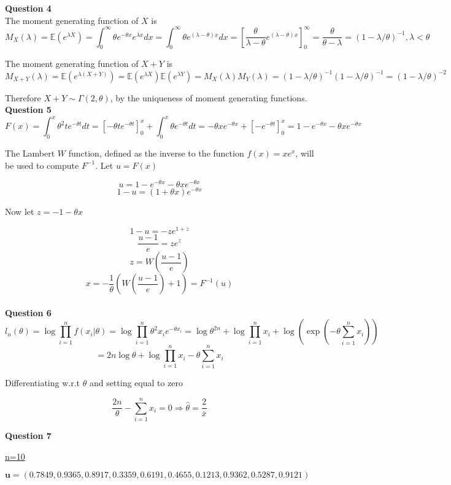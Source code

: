 \documentclass[12pt]{extarticle}
\begin{document}
\textbf{Question 4}\\

The moment generating function of $X$ is 
$$M_X(\lambda) = \mathbb{E}(e^{\lambda X}) = \int_{0}^{\infty} \theta e^{-\theta x}e^{\lambda x}dx = \int_{0}^{\infty} \theta e^{(\lambda-\theta) x}dx =\left[ \frac{\theta}{\lambda-\theta}e^{(\lambda-\theta) x} \right]_0^\infty = \frac{\theta}{\theta - \lambda} = (1-\lambda/\theta)^{-1}, \lambda < \theta$$

The moment generating function of $X+Y$ is 
$$M_{X+Y}(\lambda) = \mathbb{E}(e^{\lambda (X+Y)}) = \mathbb{E}(e^{\lambda X})\mathbb{E}(e^{\lambda Y}) = M_X(\lambda)M_Y(\lambda) = (1-\lambda/\theta)^{-1}(1-\lambda/\theta)^{-1} =  (1-\lambda/\theta)^{-2}$$

Therefore $X+Y \sim \Gamma(2,\theta)$, by the uniqueness of moment generating functions. \\

\textbf{Question 5}
$$F(x) = \int_{0}^{x}\theta^2te^{-\theta t}dt = \left[-\theta t e^{-\theta t} \right]_0^x + \int_{0}^{x}\theta e^{-\theta t} dt = -\theta x e^{-\theta x} + \left[-e^{-\theta t} \right]_0^x = 1 - e^{-\theta x} - \theta x e^{-\theta x}$$

The Lambert $W$ function, defined as the inverse to the function $f(x) = xe^x$, will be used to compute $F^{-1}$. Let $u = F(x)$

$$u = 1-e^{-\theta x} - \theta x e^{-\theta x}$$
$$1-u = (1+\theta x)e^{-\theta x}$$

Now let $z = -1- \theta x$

$$1-u = -ze^{1+z}$$
$$\frac{u-1}{e} = ze^z$$
$$z = W\left(\frac{u-1}{e}\right)$$
$$x = -\frac{1}{\theta}\left(W\left(\frac{u-1}{e}\right)+1\right) = F^{-1}(u)$$\\

\textbf{Question 6}
$$l_n(\theta) = \log{\prod_{i=1}^{n} f(x_i|\theta)} = \log{\prod_{i=1}^{n}\theta^2x_ie^{-\theta x_i}} = \log{\theta^{2n}}+\log{\prod_{i=1}^{n}x_i}+\log{\left(\exp{\left(-\theta\sum_{i=1}^{n}x_i\right)}\right)}$$
$$ = 2n\log{\theta} +\log{\prod_{i=1}^{n}x_i}-\theta\sum_{i=1}^{n}x_i$$

Differentiating w.r.t $\theta$ and setting equal to zero

$$\frac{2n}{\theta}- \sum_{i=1}^{n}x_i = 0 \Rightarrow \widehat{\theta} = \frac{2}{\bar{x}}$$

\textbf{Question 7}

\underline{n=10}

$\textbf{u} = (0.7849,0.9365,0.8917,0.3359,0.6191, 0.4655, 0.1213,0.9362,0.5287,0.9121)$
\end{document}

